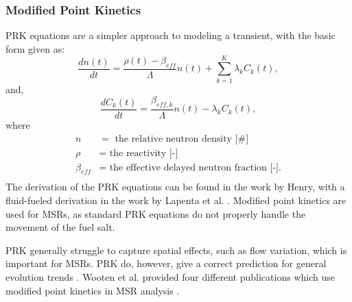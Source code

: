 \subsubsection{Modified Point Kinetics}

\Gls{PRK} equations are a simpler approach to modeling a transient, with the basic form given as:
\begin{equation}
    \frac{dn(t)}{dt} = \frac{\rho(t) - \beta_{eff}}{\Lambda} n(t) + \sum_{k=1}^K \lambda_k C_k(t),
    \label{eq:prk-n}
\end{equation}
and,
\begin{equation}
    \frac{dC_k(t)}{dt} = \frac{\beta_{eff, k}}{\Lambda} n(t) - \lambda_k C_k(t),
    \label{eq:prk-C}
\end{equation}
where
\begin{align}
n &= \mbox{ the relative neutron density [$\#$]} \nonumber\\
\rho &= \mbox{ the reactivity [-]} \nonumber\\
\beta_{eff} &= \mbox{ the effective delayed neutron fraction [-].} \nonumber\\
\end{align}
The derivation of the \gls{PRK} equations can be found in the work by Henry, with a fluid-fueled derivation in the work by Lapenta et al. \cite{henry1958application, lapenta2001point}.
Modified point kinetics are used for \glspl{MSR}, as standard \gls{PRK} equations do not properly handle the movement of the fuel salt.




\Gls{PRK} generally struggle to capture spatial effects, such as flow variation, which is important for \glspl{MSR}. 
\Gls{PRK} do, however, give a correct prediction for general evolution trends \cite{wooten2018review}.
Wooten et al. provided four different publications which use modified point kinetics in \gls{MSR} analysis \cite{guo2013simulations, merle2015physical, shi2016development, zanetti2015extension}.

